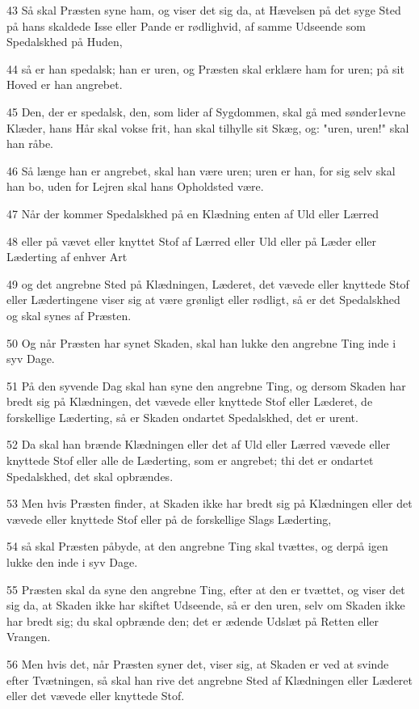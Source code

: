 \par 43 Så skal Præsten syne ham, og viser det sig da, at Hævelsen på det syge Sted på hans skaldede Isse eller Pande er rødlighvid, af samme Udseende som Spedalskhed på Huden,
\par 44 så er han spedalsk; han er uren, og Præsten skal erklære ham for uren; på sit Hoved er han angrebet.
\par 45 Den, der er spedalsk, den, som lider af Sygdommen, skal gå med sønder1evne Klæder, hans Hår skal vokse frit, han skal tilhylle sit Skæg, og: "uren, uren!" skal han råbe.
\par 46 Så længe han er angrebet, skal han være uren; uren er han, for sig selv skal han bo, uden for Lejren skal hans Opholdsted være.
\par 47 Når der kommer Spedalskhed på en Klædning enten af Uld eller Lærred
\par 48 eller på vævet eller knyttet Stof af Lærred eller Uld eller på Læder eller Læderting af enhver Art
\par 49 og det angrebne Sted på Klædningen, Læderet, det vævede eller knyttede Stof eller Lædertingene viser sig at være grønligt eller rødligt, så er det Spedalskhed og skal synes af Præsten.
\par 50 Og når Præsten har synet Skaden, skal han lukke den angrebne Ting inde i syv Dage.
\par 51 På den syvende Dag skal han syne den angrebne Ting, og dersom Skaden har bredt sig på Klædningen, det vævede eller knyttede Stof eller Læderet, de forskellige Læderting, så er Skaden ondartet Spedalskhed, det er urent.
\par 52 Da skal han brænde Klædningen eller det af Uld eller Lærred vævede eller knyttede Stof eller alle de Læderting, som er angrebet; thi det er ondartet Spedalskhed, det skal opbrændes.
\par 53 Men hvis Præsten finder, at Skaden ikke har bredt sig på Klædningen eller det vævede eller knyttede Stof eller på de forskellige Slags Læderting,
\par 54 så skal Præsten påbyde, at den angrebne Ting skal tvættes, og derpå igen lukke den inde i syv Dage.
\par 55 Præsten skal da syne den angrebne Ting, efter at den er tvættet, og viser det sig da, at Skaden ikke har skiftet Udseende, så er den uren, selv om Skaden ikke har bredt sig; du skal opbrænde den; det er ædende Udslæt på Retten eller Vrangen.
\par 56 Men hvis det, når Præsten syner det, viser sig, at Skaden er ved at svinde efter Tvætningen, så skal han rive det angrebne Sted af Klædningen eller Læderet eller det vævede eller knyttede Stof.
